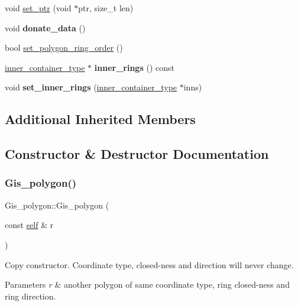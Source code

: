 \begin{DoxyCompactItemize}
void \mbox{\hyperlink{classGis__polygon_a68ca304142cc018fe18788b3a1662093}{set\+\_\+ptr}} (void $\ast$ptr, size\+\_\+t len)
\item 
\mbox{\label{classGis__polygon_aa67b7b102aeac0a562f66c59d120d021}} 
void {\bfseries donate\+\_\+data} ()
\item 
bool \mbox{\hyperlink{classGis__polygon_affcf00a3922cccdded80d21b59ee6634}{set\+\_\+polygon\+\_\+ring\+\_\+order}} ()
\item 
\mbox{\label{classGis__polygon_ab52978e7ca1f3c199a5be351498965cd}} 
\mbox{\hyperlink{classGis__wkb__vector}{inner\+\_\+container\+\_\+type}} $\ast$ {\bfseries inner\+\_\+rings} () const
\item 
\mbox{\label{classGis__polygon_a2e82637430ca68a6059aae0615ef9b59}} 
void {\bfseries set\+\_\+inner\+\_\+rings} (\mbox{\hyperlink{classGis__wkb__vector}{inner\+\_\+container\+\_\+type}} $\ast$inns)
\end{DoxyCompactItemize}
\subsection*{Additional Inherited Members}


\subsection{Constructor \& Destructor Documentation}
\mbox{\label{classGis__polygon_a5d3928384d1b9de85ceddfa783a1be1c}} 
\subsubsection{\texorpdfstring{Gis\+\_\+polygon()}{Gis\_polygon()}}
{\footnotesize\ttfamily Gis\+\_\+polygon\+::\+Gis\+\_\+polygon (\begin{DoxyParamCaption}\item[{const \mbox{\hyperlink{classGis__polygon}{self}} \&}]{r }\end{DoxyParamCaption})}

Copy constructor. Coordinate type, closed-\/ness and direction will never change. 
\begin{DoxyParams}{Parameters}
{\em r} & another polygon of same coordinate type, ring closed-\/ness and ring direction. \\
\hline
\end{DoxyParams}


